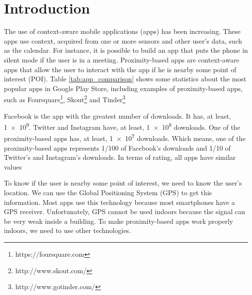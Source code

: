 
%
%

\section{Introduction}
\label{sec:introduction}


The use of context-aware mobile applications (apps)
has been increasing.
These apps use context, acquired
from one or more sensors and other user's data, 
such as the calendar. For instance, it is possible to
build an app that puts the phone in silent mode if the
user is in a meeting. Proximity-based apps are
context-aware apps that allow the user to interact
with the app if he is nearby some point of interest (POI).
Table \ref{tab:app_comparison} shows some statistics
about the most popular apps in Google Play Store,
including examples of proximity-based apps,
such as Foursquare\footnote{https://foursquare.com},
Skout\footnote{http://www.skout.com/} and
Tinder\footnote{http://www.gotinder.com/}



Facebook is the app with the
greatest number of downloads.
It has, at least, \num{1e9}. Twitter and Instagram
have, at least, \num{1e8} downloads.
One of the 
proximity-based apps has, at least, \num{1e7} downloads.
Which means, one of
the proximity-based apps represents
1/100 of Facebook's downloads and 1/10 of Twitter's
and Instagram's downloads. In terms of rating, all apps
have similar values

To know if the user is nearby some point of interest,
we need to know the user's location. We can use 
the Global Positioning System 
(GPS)\cite{masumoto1993global} to
get this information. Most apps use this technology 
because most smartphones have a GPS receiver. 
Unfortunately, GPS cannot be used indoors because 
the signal can
be very weak inside a building. To make proximity-based
apps work properly indoors, we need to use other 
technologies.
